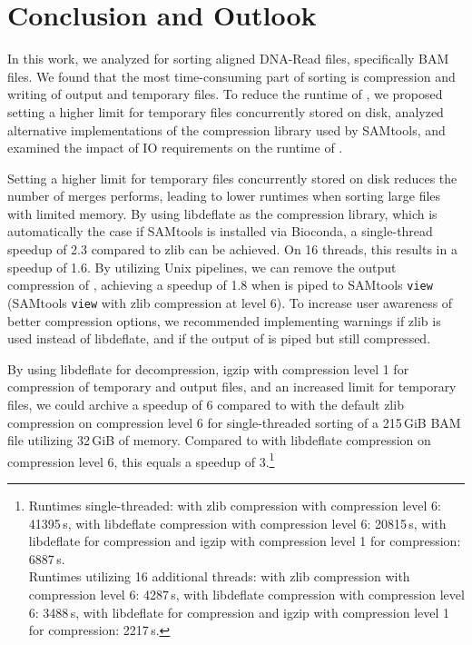 \section{Conclusion and Outlook}

In this work, we analyzed \sort for sorting aligned DNA-Read files, specifically BAM files. We found that the most time-consuming part of sorting is compression and writing of output and temporary files. To reduce the runtime of \sort, we proposed setting a higher limit for temporary files concurrently stored on disk, analyzed alternative implementations of the compression library used by SAMtools, and examined the impact of IO requirements on the runtime of \sort.

Setting a higher limit for temporary files concurrently stored on disk reduces the number of merges \sort performs, leading to lower runtimes when sorting large files with limited memory.
By using libdeflate as the compression library, which is automatically the case if SAMtools is installed via Bioconda, a single-thread speedup of 2.3 compared to zlib can be achieved. On 16 threads, this results in a speedup of 1.6.
By utilizing Unix pipelines, we can remove the output compression of \sort, achieving a speedup of 1.8 when \sort is piped to SAMtools \texttt{view} (SAMtools \texttt{view} with zlib compression at level 6).
To increase user awareness of better compression options, we recommended implementing warnings if zlib is used instead of libdeflate, and if the output of \sort is piped but still compressed. 

By using libdeflate for decompression, igzip with compression level 1 for compression of temporary and output files, and an increased limit for temporary files, we could archive a speedup of 6 compared to \sort with the default zlib compression on compression level 6 for single-threaded sorting of a 215\,GiB BAM file utilizing 32\,GiB of memory. Compared to \sort with libdeflate compression on compression level 6, this equals a speedup of 3.\footnote{Runtimes single-threaded: with zlib compression with compression level 6: 41395\,s, with libdeflate compression with compression level 6: 20815\,s, with libdeflate for compression and igzip with compression level 1 for compression: 6887\,s.\\
Runtimes utilizing 16 additional threads: with zlib compression with compression level 6: 4287\,s, with libdeflate compression with compression level 6: 3488\,s, with libdeflate for compression and igzip with compression level 1 for compression: 2217\,s.
}

